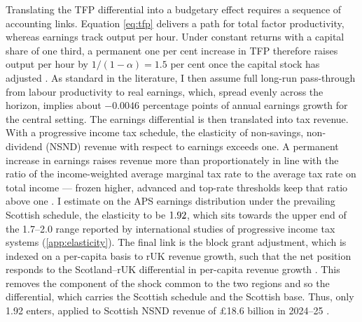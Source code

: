 Translating the TFP differential into a budgetary effect requires a sequence of accounting links. Equation \eqref{eq:tfp} delivers a path for total factor productivity, whereas earnings track output per hour. Under constant returns with a capital share of one third, a permanent one per cent increase in TFP therefore raises output per hour by $1/(1-\alpha)=1.5$ per cent once the capital stock has adjusted \citep{obr2025}. As standard in the literature, I then assume full long-run pass-through from labour productivity to real earnings, which, spread evenly across the horizon, implies about $-0.0046$ percentage points of annual earnings growth for the central setting.
The earnings differential is then translated into tax revenue. With a progressive income tax schedule, the elasticity of non-savings, non-dividend (NSND) revenue with respect to earnings exceeds one. A permanent increase in earnings raises revenue more than proportionately in line with the ratio of the income-weighted average marginal tax rate to the average tax rate on total income --- frozen higher, advanced and top-rate thresholds keep that ratio above one \citep{sgreadyreckoner2026}. I estimate on the APS earnings distribution under the prevailing Scottish schedule, the elasticity to be $1.92$, which sits towards the upper end of the 1.7--2.0 range reported by international studies of progressive income tax systems (\cref{app:elasticity}). 
The final link is the block grant adjustment, which is indexed on a per-capita basis to rUK revenue growth, such that the net position responds to the Scotland--rUK differential in per-capita revenue growth \citep{gov2023}. This removes the component of the shock common to the two regions and so the differential, which carries the Scottish schedule and the Scottish base. Thus, only 1.92 enters, applied to Scottish NSND revenue of \pounds18.6 billion in 2024--25 \citep{hmrcoutturn2025}. 


